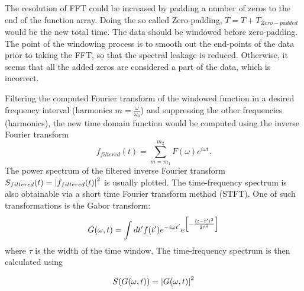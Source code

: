 \documentclass[aps,pra,shortbibliography,onecolumn,showpacs,superscriptaddress]{revtex4-1}
\begin{document}
The resolution of FFT could be increased by padding a number of zeros to the end of the function 
array. Doing the so called Zero-padding, $T=T+T_{Zero-padded}$ would be the new total time. 
The data should be windowed before zero-padding. The point of the windowing process is to 
smooth out the end-points of the data prior to taking the FFT, so that the spectral leakage is 
reduced. Otherwise, it seems that all the added zeros are considered a part of the data, which is 
incorrect.

\par
	
	Filtering the computed Fourier transform  of the windowed function in a desired frequency 
	interval (harmonics $m=\frac{\omega}{\omega_0}$) and suppressing the other frequencies 
	(harmonics), the new time domain function would be computed using the inverse Fourier 
	transform 
	\begin{equation}
		\label{eq:ftF}
		f_{filtered}(t) = \displaystyle\sum_{m=m_1}^{m_2} F(\omega)e^{i\omega{t}}.
	\end{equation}
	The power spectrum of the filtered inverse Fourier transform 
	$S_{filtered}(t)=\abs{f_{filtered}(t)}^2$ is usually plotted. 
	The time-frequency spectrum is also obtainable via a short time Fourier transform method 
	(STFT). One of such transformations is the Gabor transform:
	\begin{equation}
		\label{eq:GTP}
		G(\omega ,t) = \int{d{t^\prime }f(t^\prime ) e^{- 
				i\omega t^\prime} e^\qty[- \frac{(t-t^\prime)^2}{2\tau^2}]}
	\end{equation}
	where $\tau$ is the width of the time window. The time-frequency spectrum is then calculated 
	using 
	
	\begin{equation}
		\label{eq:GTP}
		S(G(\omega ,t)) = \abs{G(\omega ,t)}^2
	\end{equation}
	
\end{document}
